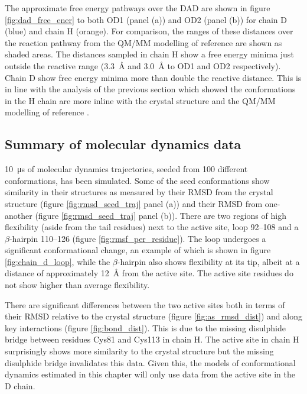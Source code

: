 The approximate free energy pathways over the DAD are shown in figure \ref{fig:dad_free_ener} to both OD1 (panel (a)) and OD2 (panel (b)) for chain D (blue) and chain H (orange).  For comparison, the ranges of these distances over the reaction pathway from the QM/MM modelling of reference \cite{ranaghanInitioQMMM2017} are shown as shaded areas. The distances sampled in chain H show a free energy minima just outside the reactive range (\SI{3.3}{\angstrom} and \SI{3.0}{\angstrom} to OD1 and OD2 respectively). Chain D show free energy minima more than double the reactive distance.  This is in line with the analysis of the previous section which showed the conformations in the H chain are more inline with the crystal structure and the QM/MM modelling of reference \cite{ranaghanInitioQMMM2017}. 


\subsection{Summary of molecular dynamics data}\label{sec:md_summary}

\SI{10}{\micro\second} of molecular dynamics trajectories, seeded from \num{100} different conformations, has been simulated.  Some of the seed conformations show similarity in their structures as measured by their RMSD from the crystal structure (figure \ref{fig:rmsd_seed_traj} panel (a)) and their RMSD from one-another (figure \ref{fig:rmsd_seed_traj} panel (b)). There are two regions of high flexibility (aside from the tail residues) next to the active site, loop \numrange[range-phrase=\text{--}]{92}{108} and a $\beta$-hairpin \numrange[range-phrase=\text{--}]{110}{126} (figure \ref{fig:rmsf_per_residue}).  The loop undergoes a significant conformational change, an example of which is shown in figure \ref{fig:chain_d_loop}, while the $\beta$-hairpin also shows flexibility at its tip, albeit at a distance of approximately \SI{12}{\angstrom} from the active site. The active site residues do not show higher than average flexibility. 

There are significant differences between the two active sites both in terms of their RMSD relative to the crystal structure (figure \ref{fig:as_rmsd_dist}) and along key interactions (figure \ref{fig:bond_dist}).  This is due to the missing disulphide bridge between residues Cys81 and Cys113 in chain H. The active site in chain H surprisingly shows more similarity to the crystal structure but the  missing disulphide bridge invalidates this data. Given this, the models of conformational dynamics estimated in this chapter will only use data from the active site in the D chain. 


